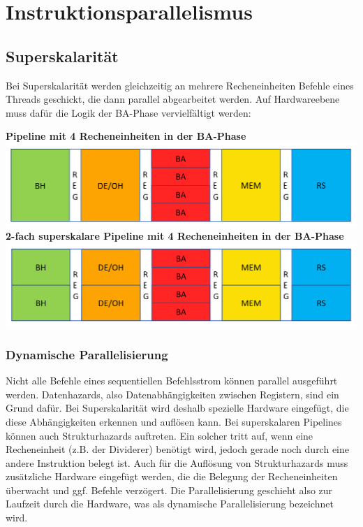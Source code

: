 \section{Instruktionsparallelismus}
	\subsection{Superskalarität}
		Bei Superskalarität werden gleichzeitig an mehrere Recheneinheiten Befehle eines Threads geschickt, die dann parallel abgearbeitet werden. Auf Hardwareebene muss dafür die Logik der BA-Phase vervielfältigt werden: \newline
		\begin{center}
			\textbf{Pipeline mit 4 Recheneinheiten in der BA-Phase} \newline
			\includegraphics[scale=0.45]{Superskalare_Pipeline_mit_4_BA.png}
			\textbf{2-fach superskalare Pipeline mit 4 Recheneinheiten in der BA-Phase}\newline
			\includegraphics[scale=0.45]{2-fach_Superskalare_Pipeline_mit_4_BA.png}
		\end{center}
		\subsubsection{Dynamische Parallelisierung}
			Nicht alle Befehle eines sequentiellen Befehlsstrom können parallel ausgeführt werden. Datenhazards, also Datenabhängigkeiten zwischen Registern, sind ein Grund dafür. Bei Superskalarität wird deshalb spezielle Hardware eingefügt, die diese Abhängigkeiten erkennen und auflösen kann. \newline \newline
			Bei superskalaren Pipelines können auch Strukturhazards auftreten. Ein solcher tritt auf, wenn eine Recheneinheit (z.B. der Dividerer) benötigt wird, jedoch gerade noch durch eine andere Instruktion belegt ist. Auch für die Auflösung von Strukturhazards muss zusätzliche Hardware eingefügt werden, die die Belegung der Recheneinheiten überwacht und ggf. Befehle verzögert. \newline \newline
			Die Parallelisierung geschieht also zur Laufzeit durch die Hardware, was als dynamische Parallelisierung bezeichnet wird.
